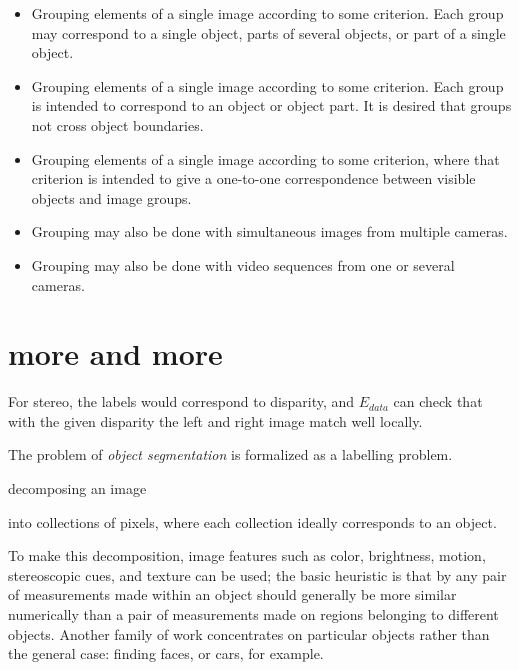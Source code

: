 \begin{itemize}

\item Grouping elements of a single image according to some
criterion.  Each group may correspond to a single object, parts of
several objects, or part of a single object.

\item Grouping elements of a single image according to some
criterion.  Each group is intended to correspond to an object or
object part.  It is desired that groups not cross object boundaries.

\item Grouping elements of a single image according to some
criterion, where that criterion is intended to give a 
one-to-one correspondence between visible objects and
image groups.

\item Grouping may also be done with simultaneous images from
multiple cameras.

\item Grouping may also be done with video sequences from one or 
several cameras.

\end{itemize}







\section{more and more}

For stereo, the labels would correspond to disparity,
and $E_{data}$ can check that with the given disparity
the left and right image match well locally.


The problem of {\em object segmentation} is formalized as
a labelling problem.

decomposing an image

 into collections of pixels, where each collection
ideally corresponds to an object.


To make this decomposition, image
features such as color, brightness, motion, stereoscopic cues, and
texture can be used; the basic heuristic is that by any pair of
measurements made within an object should generally be more similar
numerically than a pair of measurements made on regions belonging to
different objects.  Another family of work concentrates on particular
objects rather than the general case: finding faces, or cars, for
example.

